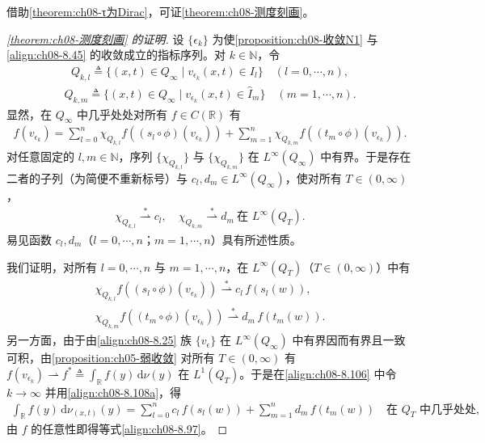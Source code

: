 \documentclass[../../main.tex]{subfiles}%
\begin{document}
借助\cref{theorem:ch08-τ为Dirac}，可证\cref{theorem:ch08-测度刻画}。

\begin{proof}[\cref{theorem:ch08-测度刻画} 的证明]
设 $\{\epsilon_k\}$ 为使\cref{proposition:ch08-收敛N1} 与\eqref{align:ch08-8.45} 的收敛成立的指标序列。对 $k\in\mathbb{N}$，令
\begin{align*}
Q_{k,l}\triangleq \{(x,t)\in Q_\infty\mid v_{\epsilon_k}(x,t)\in I_l\}\quad(l=0,\cdots ,n),
\end{align*}
\begin{align*}
Q_{k,m}\triangleq \{(x,t)\in Q_\infty\mid v_{\epsilon_k}(x,t)\in\widehat I_m\}\quad(m=1,\cdots ,n).
\end{align*}
显然，在 $Q_\infty$ 中几乎处处对所有 $f\in C(\mathbb{R})$ 有
\begin{align}
f(v_{\epsilon_k})=\sum_{l=0}^n\chi_{Q_{k,l}}f((s_l\circ\phi)(v_{\epsilon_k}))
+\sum_{m=1}^n\chi_{Q_{k,m}}f((t_m\circ\phi)(v_{\epsilon_k})). \label{align:ch08-8.106}
\end{align}
对任意固定的 $l,m\in\mathbb{N}$，序列 $\{\chi_{Q_{k,l}}\}$ 与 $\{\chi_{Q_{k,m}}\}$ 在 $L^\infty(Q_\infty)$ 中有界。于是存在二者的子列（为简便不重新标号）与 $c_l,d_m\in L^\infty(Q_\infty)$，使对所有 $T\in(0,\infty)$，
\begin{align}
\chi_{Q_{k,l}}\stackrel{*}{\rightharpoonup}c_l,\quad
\chi_{Q_{k,m}}\stackrel{*}{\rightharpoonup}d_m\ \text{在 }L^\infty(Q_T). \label{align:ch08-8.107}
\end{align}
易见函数 $c_l,d_m$（$l=0,\cdots ,n$；$m=1,\cdots ,n$）具有所述性质。

我们证明，对所有 $l=0,\cdots ,n$ 与 $m=1,\cdots ,n$，在 $L^\infty(Q_T)$（$T\in(0,\infty)$）中有
\begin{align}
\chi_{Q_{k,l}}f((s_l\circ\phi)(v_{\epsilon_k}))\stackrel{*}{\rightharpoonup}c_l\,f(s_l(w)), \label{align:ch08-8.108a}\\
\chi_{Q_{k,m}}f((t_m\circ\phi)(v_{\epsilon_k}))\stackrel{*}{\rightharpoonup}d_m\,f(t_m(w)). \label{align:ch08-8.108b}
\end{align}
另一方面，由于由\eqref{align:ch08-8.25} 族 $\{v_\epsilon\}$ 在 $L^\infty(Q_\infty)$ 中有界因而有界且一致可积，由\cref{proposition:ch05-弱收敛} 对所有 $T\in(0,\infty)$ 有 $f(v_{\epsilon_k})\rightharpoonup f^*\triangleq \int_{\mathbb{R}}f(y)\,\mathrm{d}\nu(y)$ 在 $L^1(Q_T)$。于是在\eqref{align:ch08-8.106} 中令 $k\to\infty$ 并用\eqref{align:ch08-8.108a}，得
\begin{align*}
\int_{\mathbb{R}}f(y)\,\mathrm{d}\nu_{(x,t)}(y)
=\sum_{l=0}^n c_l\,f(s_l(w))+\sum_{m=1}^n d_m\,f(t_m(w))\quad\text{在 }Q_T\text{ 中几乎处处},
\end{align*}
由 $f$ 的任意性即得等式\eqref{align:ch08-8.97}。


\end{proof}
\end{document}
